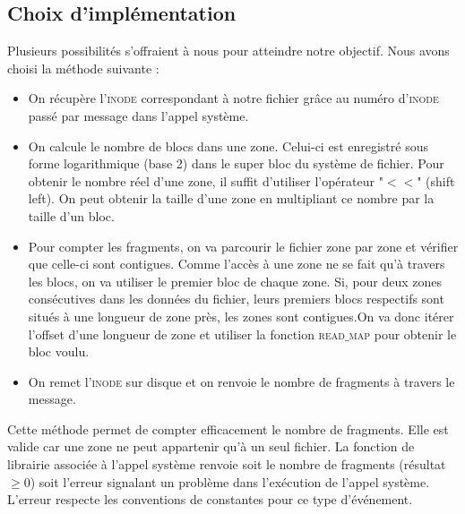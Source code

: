 \subsection*{Choix d'implémentation}
Plusieurs possibilités s'offraient à nous pour atteindre notre objectif. Nous avons choisi la méthode suivante :

\begin{itemize}
\item On récupère l'\textsc{inode} correspondant à notre fichier grâce au numéro d'\textsc{inode} passé par message dans l'appel système.
\item On calcule le nombre de blocs dans une zone. Celui-ci est enregistré sous forme logarithmique (base 2) dans le super bloc du système de fichier. Pour obtenir le nombre réel d'une zone, il suffit d'utiliser l'opérateur "$<<$" (shift left). On peut obtenir la taille d'une zone en multipliant ce nombre par la taille d'un bloc.
\item Pour compter les fragments, on va parcourir le fichier zone par zone et vérifier que celle-ci sont contigues. Comme l'accès à une zone ne se fait qu'à travers les blocs, on va utiliser le premier bloc de chaque zone. Si, pour deux zones consécutives dans les données du fichier, leurs premiers blocs respectifs sont situés à une longueur de zone près, les zones sont contigues.On va donc itérer l'offset d'une longueur de zone et utiliser la fonction \textsc{read$\_$map} pour obtenir le bloc voulu.
\item On remet l'\textsc{inode} sur disque et on renvoie le nombre de fragments à travers le message.
\end{itemize}

Cette méthode permet de compter efficacement le nombre de fragments. Elle est valide car une zone ne peut appartenir qu'à un seul fichier. La fonction de librairie associée à l'appel système renvoie soit le nombre de fragments (résultat $\geq0$) soit l'erreur signalant un problème dans l'exécution de l'appel système. L'erreur respecte les conventions de constantes pour ce type d'événement. 
